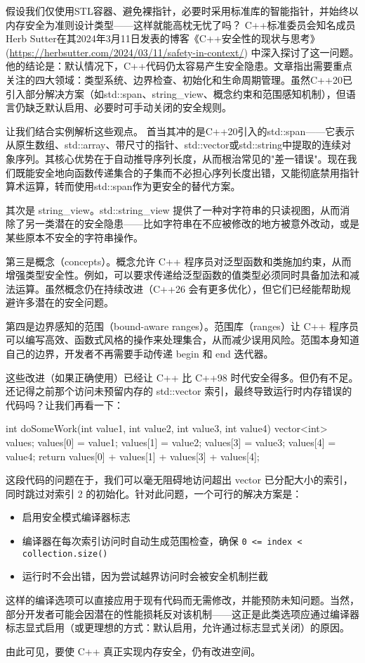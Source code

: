 
假设我们仅使用STL容器、避免裸指针，必要时采用标准库的智能指针，并始终以内存安全为准则设计类型——这样就能高枕无忧了吗？
C++标准委员会知名成员Herb Sutter在其2024年3月11日发表的博客《C++安全性的现状与思考》(\url{https://herbsutter.com/2024/03/11/safety-in-context/}) 中深入探讨了这一问题。他的结论是：默认情况下，C++代码仍太容易产生安全隐患。文章指出需要重点关注的四大领域：类型系统、边界检查、初始化和生命周期管理。虽然C++20已引入部分解决方案（如std::span、string\_view、概念约束和范围感知机制），但语言仍缺乏默认启用、必要时可手动关闭的安全规则。

让我们结合实例解析这些观点。
首当其冲的是C++20引入的std::span——它表示从原生数组、std::array、带尺寸的指针、std::vector或std::string中提取的连续对象序列。其核心优势在于自动推导序列长度，从而根治常见的"差一错误"。现在我们既能安全地向函数传递集合的子集而不必担心序列长度出错，又能彻底禁用指针算术运算，转而使用std::span作为更安全的替代方案。

其次是 string\_view。std::string\_view 提供了一种对字符串的只读视图，从而消除了另一类潜在的安全隐患——比如字符串在不应被修改的地方被意外改动，或是某些原本不安全的字符串操作。

第三是概念（concepts）。概念允许 C++ 程序员对泛型函数和类施加约束，从而增强类型安全性。例如，可以要求传递给泛型函数的值类型必须同时具备加法和减法运算。虽然概念仍在持续改进（C++26 会有更多优化），但它们已经能帮助规避许多潜在的安全问题。

第四是边界感知的范围（bound-aware ranges）。范围库（ranges）让 C++ 程序员可以编写高效、函数式风格的操作来处理集合，从而减少误用风险。范围本身知道自己的边界，开发者不再需要手动传递 begin 和 end 迭代器。

这些改进（如果正确使用）已经让 C++ 比 C++98 时代安全得多。但仍有不足。还记得之前那个访问未预留内存的 std::vector 索引，最终导致运行时内存错误的代码吗？让我们再看一下：

\begin{cpp}
int doSomeWork(int value1, int value2, int value3, int value4) {
  vector<int> values;
  values[0] = value1;
  values[1] = value2;
  values[3] = value3;
  values[4] = value4;
  return values[0] + values[1] + values[3] + values[4];
}
\end{cpp}

这段代码的问题在于，我们可以毫无阻碍地访问超出 vector 已分配大小的索引，同时跳过对索引 2 的初始化。针对此问题，一个可行的解决方案是：

\begin{itemize}
\item 
启用安全模式编译器标志

\item 
编译器在每次索引访问时自动生成范围检查，确保 \verb|0 <= index < collection.size()|

\item 
运行时不会出错，因为尝试越界访问时会被安全机制拦截
\end{itemize}

这样的编译选项可以直接应用于现有代码而无需修改，并能预防未知问题。当然，部分开发者可能会因潜在的性能损耗反对该机制——这正是此类选项应通过编译器标志显式启用（或更理想的方式：默认启用，允许通过标志显式关闭）的原因。

由此可见，要使 C++ 真正实现内存安全，仍有改进空间。
